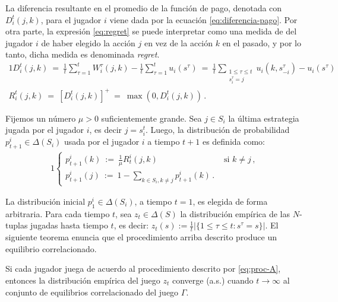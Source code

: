 La diferencia resultante en el promedio de la función de pago, denotada con $D_i^t(j, k)$, para el jugador $i$ viene dada por la ecuación \ref{eq:diferencia-pago}. Por otra parte, la expresión \eqref{eq:regret} se puede interpretar como una medida de  del jugador $i$ de haber elegido la acción $j$ en vez de la acción $k$ en el pasado, y por lo tanto, dicha medida es denominada \textit{regret}.
\begin{alignat}{1}
\label{eq:diferencia-pago}
  D_i^t(j, k)\ 
    =\ \frac{1}{t} \sum_{\tau = 1}^{t} W_i^{\tau}(j, k) - \frac{1}{t} \sum_{\tau = 1}^{t} u_i(s^{\tau})\ 
	=\ \frac{1}{t} \sum_{\substack{1\leq \tau \leq t \\s^\tau_i = j}} u_i(k, s_{-i}^{\tau}) - u_i(s^{\tau}) \\
\label{eq:regret}
R_i^t(j, k)\ =\ [D_i^t(j, k)]^+\ =\ \max(0, D_i^t(j, k)) \,.
\end{alignat}

Fijemos un número $\mu > 0$ suficientemente grande. Sea $j \in S_i$ la última estrategia jugada por el jugador $i$, es decir $j = s_i^t$. Luego, la distribución de probabilidad $p_{t+1}^i \in \Delta(S_i)$ usada por el jugador $i$ a tiempo $t+1$ es definida como:
\begin{alignat}{1}
\label{eq:proc-A}
  \begin{cases}
    p_{t+1}^i(k)\ :=\  \frac{1}{\mu} R_t^i(j, k) & \text{ si } k \neq j \,, \\
    p_{t+1}^i(j)\ :=\ 1 - \sum_{k \in S_i, k \neq j} p_{t+1}^i(k) \,.
  \end{cases}
\end{alignat}

La distribución inicial $p_{1}^i \in \Delta(S_i)$, a tiempo $t=1$, es elegida de forma arbitraria. Para cada tiempo $t$, sea $z_t \in \Delta(S)$ la distribución empírica de las $N$-tuplas jugadas hasta tiempo $t$, es decir:
$z_t(s) := \frac{1}{t} |\{1\leq\tau \leq t : s^{\tau} = s \}|$. El siguiente teorema enuncia que el procedimiento arriba descrito produce un equilibrio correlacionado.

\begin{theorem}
\label{theo:conv-proc-A}
Si cada jugador juega de acuerdo al procedimiento descrito por \eqref{eq:proc-A}, entonces la distribución empírica del juego $z_t$ converge (a.s.) cuando $t \rightarrow \infty$ al conjunto de equilibrios correlacionado del juego $\Gamma$.
\end{theorem}


